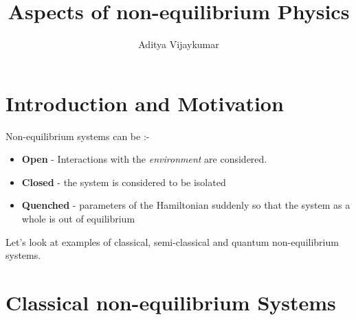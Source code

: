 \documentclass[a4paper,11pt]{article}
\title{\textbf{Aspects of non-equilibrium Physics}}
\author{Aditya Vijaykumar}
\affiliation{International Centre for Theoretical Sciences, Bengaluru, India.}
\begin{document}
\maketitle

\section{Introduction and Motivation}
Non-equilibrium systems can be :-
\begin{itemize}
	\item \textbf{Open} - Interactions with the \textit{environment} are considered.
	\item \textbf{Closed} - the system is considered to be isolated
	\item \textbf{Quenched} - parameters of the Hamiltonian suddenly so that the system as a whole is out of equilibrium
\end{itemize}
Let's look at examples of classical, semi-classical and quantum non-equilibrium systems.
\section{Classical non-equilibrium Systems} 
\end{document}
